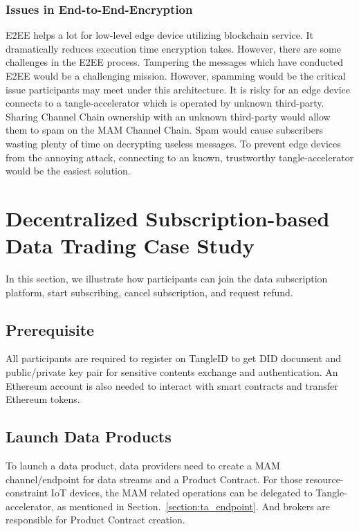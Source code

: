 \documentclass[conference]{IEEEtran}
\begin{document}
\subsubsection{Issues in End-to-End-Encryption}
E2EE helps a lot for low-level edge device utilizing blockchain service. It dramatically reduces execution time encryption takes. However, there are some challenges in the E2EE process. Tampering the messages which have conducted E2EE would be a challenging mission. However, spamming would be the critical issue participants may meet under this architecture. It is risky for an edge device connects to a tangle-accelerator which is operated by unknown third-party. Sharing Channel Chain ownership with an unknown third-party would allow them to spam on the MAM Channel Chain. Spam would cause subscribers wasting plenty of time on decrypting useless messages. To prevent edge devices from the annoying attack, connecting to an known, trustworthy tangle-accelerator would be the easiest solution.

\section{Decentralized Subscription-based Data Trading Case Study}
\label{section:trading_model}
In this section, we illustrate how participants can join the data subscription platform, start subscribing, cancel subscription, and request refund.

\subsection{Prerequisite}
All participants are required to register on TangleID to get DID document and public/private key pair for sensitive contents exchange and authentication. An Ethereum account is also needed to interact with smart contracts and transfer Ethereum tokens.

\subsection{Launch Data Products}
To launch a data product, data providers need to create a MAM channel/endpoint for data streams and a Product Contract. For those resource-constraint IoT devices, the MAM related operations can be delegated to Tangle-accelerator, as mentioned in Section.~\ref{section:ta_endpoint}. And brokers are responsible for Product Contract creation. 
\end{document}
